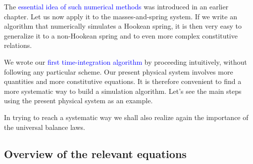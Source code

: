 \documentclass[a4paper,12pt,%
onecolumn,oneside,titlepage,%
british%
]{memoir}
\renewcommand*{\|}[1][]{\nonscript\:#1\vert\nonscript\:\mathopen{}}
\newcommand*{\sect}{\S}%
\renewcommand*{\autoref}[2]{\sidepar{\vspace{-1ex}\footnotesize{\color{blue}\faIcon{%
reply%
}\enspace\sect\,\ref{#1} page\,\pageref{#1}}}\textcolor{blue}{#2}}
\newcommand*{\masse}{mass-energy}
\begin{document}
The \autoref{sec:numeric_simulation}{essential idea of such numerical methods} was introduced in an earlier chapter. Let us now apply it to the masses-and-spring system. If we write an algorithm that numerically simulates a Hookean spring, it is then very easy to generalize it to a non-Hookean spring and to even more complex constitutive relations.


We wrote our \autoref{sec:applicable_numericintegration}{first time-integration algorithm} by proceeding intuitively, without following any particular scheme. Our present physical system involves more quantities and more constitutive equations. It is therefore convenient to find a more systematic way to build a simulation algorithm. Let's see the main steps using the present physical system as an example.

In trying to reach a systematic way we shall also realize again the importance of the universal balance laws.

\subsection{Overview of the relevant equations}
\label{sec:summary_equations_strategy_script}
\end{document}
